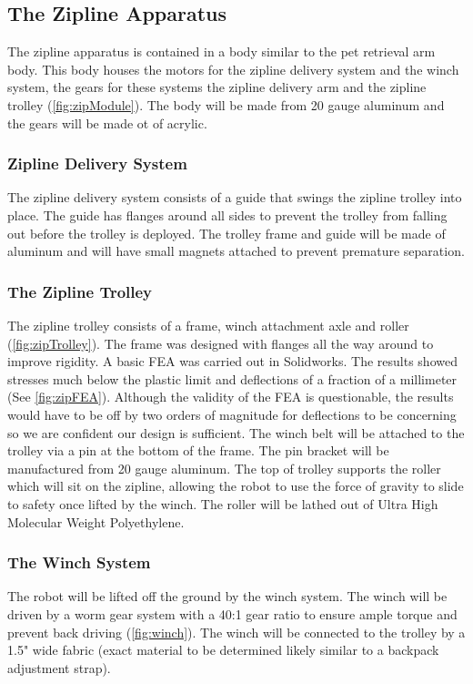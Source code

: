 \documentclass[11pt, oneside]{article} %
\begin{document}
	\subsection{The Zipline Apparatus}
	The zipline apparatus is contained in a body similar to the pet retrieval arm body. This body houses the motors for the zipline delivery system and the winch system, the gears for these systems the zipline delivery arm and the zipline trolley (\autoref{fig:zipModule}). The body will be made from 20 gauge aluminum and the gears will be made ot of acrylic.
	
		\subsubsection{Zipline Delivery System}
		The zipline delivery system consists of a guide that swings the zipline trolley into place. The guide has flanges around all sides to prevent the trolley from falling out before the 
		trolley is deployed. The trolley frame and guide will be made of aluminum and will have small magnets attached to prevent premature separation.  
		
		\subsubsection{The Zipline Trolley}
		The zipline trolley consists of a frame, winch attachment axle and roller (\autoref{fig:zipTrolley}). The frame was designed with flanges all the way around to improve rigidity. A basic FEA was carried out in Solidworks. The results showed stresses much below the plastic limit and deflections of a fraction of a millimeter (See \autoref{fig:zipFEA}). Although the validity of the FEA is questionable, the results would have to be off by two orders of magnitude for deflections to be concerning so we are confident our design is sufficient. The winch belt will be attached to the trolley via a pin at the bottom of the frame. The pin bracket will be manufactured from 20 gauge aluminum. The top of trolley supports the roller which will sit on the zipline, allowing the robot to use the force of gravity to slide to safety once lifted by the winch. The roller will be lathed out of Ultra High Molecular Weight Polyethylene.
		
		\subsubsection{The Winch System}
		The robot will be lifted off the ground by the winch system. The winch will be driven by a worm gear system with a 40:1 gear ratio to ensure ample torque and prevent back driving (\autoref{fig:winch}). The winch will be connected to the trolley by a 1.5" wide fabric (exact material to be determined likely similar to a backpack adjustment strap). 
		
\end{document}
